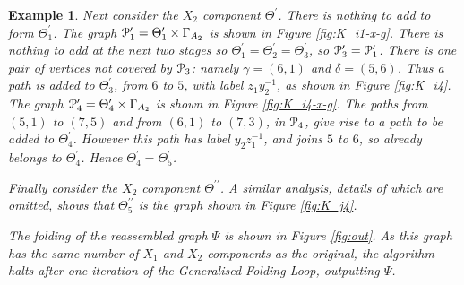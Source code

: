 \documentclass[a4paper,12pt]{article}
\newcommand{\G}{\Gamma }
\newcommand{\g}{\gamma }
\renewcommand{\d}{\delta }
\newcommand{\T}{\Theta }
\newcommand{\cP}{{\cal{P}}}
\newtheorem{exam}[theorem]{Example}
\newenvironment{example}{\begin{exam} \rm}{\end{exam}}
\numberwithin{equation}{section}
\numberwithin{figure}{section}
\begin{document}
\begin{example}
Next consider the $X_2$ component $\T^\prime$. There is nothing to
add to form $\T^\prime_1$. The graph $\cP_1^\prime=\T_1^\prime
\times \G_{A_2}$ is shown in Figure \ref{fig:K_i1-x-g}. There is
nothing to add at the next two  stages so
$\T_1^\prime=\T_2^\prime=\T_3^\prime$, so
$\cP_3^\prime=\cP_1^\prime$. There is one pair of vertices not
covered by $\cP_3$: namely $\g=(6,1)$ and $\d=(5,6)$. Thus a path
is added to $\T_3^\prime$, from $6$ to $5$, with label
$z_1y_2^{-1}$, as shown in Figure \ref{fig:K_i4}. The graph
 $\cP_4^\prime=\T_4^\prime \times \G_{A_2}$ is shown in Figure \ref{fig:K_i4-x-g}. The paths
from $(5,1)$ to $(7,5)$ and from $(6,1)$ to $(7,3)$, in $\cP_4$, give rise to a path to be
added to $\T_4^\prime$. However this path has label $y_2z_1^{-1}$, and joins $5$ to $6$, so already
belongs to $\T_4^\prime$. Hence $\T_4^\prime=\T_5^\prime$.

Finally consider the $X_2$ component $\T^{\prime\prime}$. A similar analysis, details of which
are omitted, shows that $ \T^{\prime\prime}_5$ is the graph shown in Figure \ref{fig:K_j4}.

The folding of the reassembled graph $\Psi$ is shown in  Figure
\ref{fig:out}.  As this graph has the same number of $X_1$ and $X_2$ components as the original,
the algorithm halts after one iteration of the Generalised Folding Loop, outputting $\Psi$.

\end{example}
\end{document}
